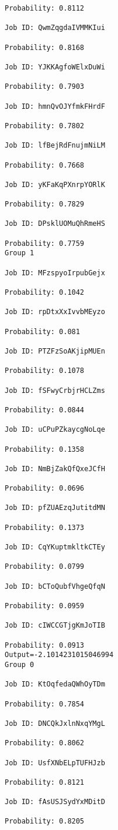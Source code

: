 \documentclass[11pt]{article}
\begin{document}
\begin{Verbatim}[commandchars=\\\{\}]
Probability: 0.8112

Job ID: QwmZqgdaIVMMKIui

Probability: 0.8168

Job ID: YJKKAgfoWElxDuWi

Probability: 0.7903

Job ID: hmnQvOJYfmkFHrdF

Probability: 0.7802

Job ID: lfBejRdFnujmNiLM

Probability: 0.7668

Job ID: yKFaKqPXnrpYORlK

Probability: 0.7829

Job ID: DPsklUOMuQhRmeHS

Probability: 0.7759
Group 1

Job ID: MFzspyoIrpubGejx

Probability: 0.1042

Job ID: rpDtxXxIvvbMEyzo

Probability: 0.081

Job ID: PTZFzSoAKjipMUEn

Probability: 0.1078

Job ID: fSFwyCrbjrHCLZms

Probability: 0.0844

Job ID: uCPuPZkaycgNoLqe

Probability: 0.1358

Job ID: NmBjZakQfQxeJCfH

Probability: 0.0696

Job ID: pfZUAEzqJutitdMN

Probability: 0.1373

Job ID: CqYKuptmkltkCTEy

Probability: 0.0799

Job ID: bCToQubfVhgeQfqN

Probability: 0.0959

Job ID: cIWCCGTjgKmJoTIB

Probability: 0.0913
Output=-2.1014231015046994
Group 0

Job ID: KtOqfedaQWhOyTDm

Probability: 0.7854

Job ID: DNCQkJxlnNxqYMgL

Probability: 0.8062

Job ID: UsfXNbELpTUFHJzb

Probability: 0.8121

Job ID: fAsUSJSydYxMDitD

Probability: 0.8205


\end{Verbatim}
\end{document}

